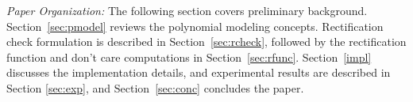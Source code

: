 

{\it Paper Organization:} The following section covers preliminary
background. Section~\ref{sec:pmodel} reviews the polynomial modeling
concepts. Rectification check formulation is described in
Section~\ref{sec:rcheck}, followed by the rectification function and
don't care computations in Section~\ref{sec:rfunc}. Section~\ref{impl}
discusses the implementation details, and experimental
results are described in Section \ref{sec:exp}, and
Section~\ref{sec:conc} concludes the paper. 